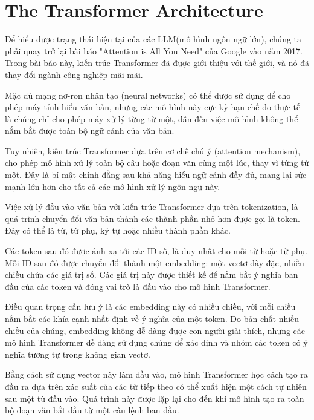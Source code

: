 \section{The Transformer Architecture}
Để hiểu được trạng thái hiện tại của các LLM(mô hình ngôn ngữ lớn), chúng ta phải quay trở lại bài báo "Attention is All You Need" của Google vào năm 2017. Trong bài báo này, kiến trúc Transformer đã được giới thiệu với thế giới, và nó đã thay đổi ngành công nghiệp mãi mãi.

Mặc dù mạng nơ-ron nhân tạo (neural networks) có thể được sử dụng để cho phép máy tính hiểu văn bản, nhưng các mô hình này cực kỳ hạn chế do thực tế là chúng chỉ cho phép máy xử lý từng từ một, dẫn đến việc mô hình không thể nắm bắt được toàn bộ ngữ cảnh của văn bản.

Tuy nhiên, kiến trúc Transformer dựa trên cơ chế chú ý (attention mechanism), cho phép mô hình xử lý toàn bộ câu hoặc đoạn văn cùng một lúc, thay vì từng từ một. Đây là bí mật chính đằng sau khả năng hiểu ngữ cảnh đầy đủ, mang lại sức mạnh lớn hơn cho tất cả các mô hình xử lý ngôn ngữ này.

Việc xử lý đầu vào văn bản với kiến trúc Transformer dựa trên tokenization, là quá trình chuyển đổi văn bản thành các thành phần nhỏ hơn được gọi là token. Đây có thể là từ, từ phụ, ký tự hoặc nhiều thành phần khác.

Các token sau đó được ánh xạ tới các ID số, là duy nhất cho mỗi từ hoặc từ phụ. Mỗi ID sau đó được chuyển đổi thành một embedding: một vectơ dày đặc, nhiều chiều chứa các giá trị số. Các giá trị này được thiết kế để nắm bắt ý nghĩa ban đầu của các token và đóng vai trò là đầu vào cho mô hình Transformer.

Điều quan trọng cần lưu ý là các embedding này có nhiều chiều, với mỗi chiều nắm bắt các khía cạnh nhất định về ý nghĩa của một token. Do bản chất nhiều chiều của chúng, embedding không dễ dàng được con người giải thích, nhưng các mô hình Transformer dễ dàng sử dụng chúng để xác định và nhóm các token có ý nghĩa tương tự trong không gian vectơ.

Bằng cách sử dụng vector này làm đầu vào, mô hình Transformer học cách tạo ra đầu ra dựa trên xác suất của các từ tiếp theo có thể xuất hiện một cách tự nhiên sau một từ đầu vào. Quá trình này được lặp lại cho đến khi mô hình tạo ra toàn bộ đoạn văn bắt đầu từ một câu lệnh ban đầu.

